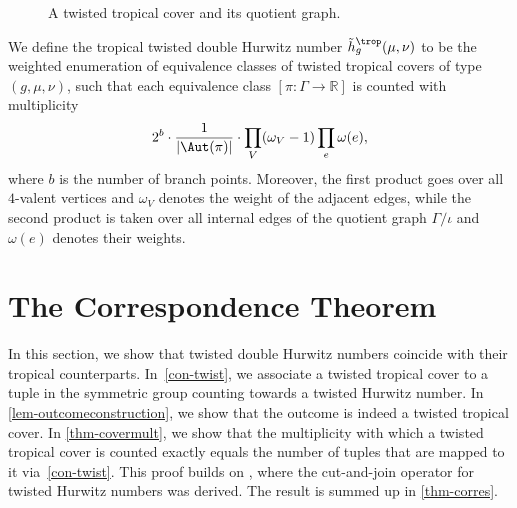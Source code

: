 \begin{figure}
\caption{A twisted tropical cover and its quotient graph.}
\label{fig:extwist}
\end{figure}

\begin{defi}
\label{def:twisttrophn}
We define the tropical twisted double Hurwitz 
number $\tilde{h}^{\trop}_g(\mu,\nu)$ to be  the weighted enumeration of equivalence classes of twisted tropical covers of type $(g,\mu,\nu)$, such that each equivalence class $[\pi\colon \Gamma\to\mathbb{R}]$ is counted with multiplicity
\begin{equation*}
    2^{b}\cdot \frac{1}{|\Aut(\pi)|}\cdot\prod_V (\omega_V-1)\prod_e\omega(e),
\end{equation*}
where $b$ is the number of branch points. Moreover, the first product goes over all $4$-valent vertices and $\omega_V$ denotes the weight of the adjacent edges, while the second product is taken over all internal edges of the quotient graph $\Gamma/\iota$ and $\omega(e)$ denotes their weights.
\end{defi}

\section{The Correspondence Theorem}
\label{sec:corr}
In this section, we show that  twisted double Hurwitz numbers coincide with their tropical counterparts.
In~\cref{con-twist}, we associate a twisted tropical cover to a tuple in the symmetric group counting towards a twisted Hurwitz number. In \cref{lem-outcomeconstruction}, we show that the outcome is indeed a twisted tropical cover. In \cref{thm-covermult}, we show that the multiplicity with which a twisted tropical cover is counted exactly equals the number of tuples that are mapped to it via~\cref{con-twist}. This proof builds on \cite[Theorem 2.12]{BF21}, where the cut-and-join operator for twisted Hurwitz numbers was derived.
The result is summed up in \cref{thm-corres}.

